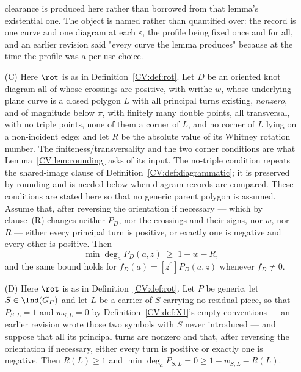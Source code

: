 \begin{theorem}
\begin{enumerate}
clearance is produced here rather than borrowed from that lemma's existential
one. The object is named rather than quantified over: the record is one curve
and one diagram at each $\varepsilon$, the profile being fixed once and for all,
and an earlier revision said "every curve the lemma produces" because at the
time the profile was a per-use choice.
\item[(C)] Here $\rot$ is as in Definition~\ref{CV:def:rot}.
Let $D$ be an oriented knot diagram all of whose crossings are positive, with
writhe $w$, whose underlying plane curve is a closed polygon $L$ with all
principal turns existing, \emph{nonzero}, and of magnitude below $\pi$, with
finitely many double points, all transversal, with no triple points, none of
them a corner of $L$, and no corner of $L$ lying on a non-incident edge; and let
$R$ be the absolute value of its Whitney rotation number.  The
finiteness/transversality and the two corner conditions are what
Lemma~\ref{CV:lem:rounding} asks of its input.  The no-triple condition repeats the
shared-image clause of Definition~\ref{CV:def:diagrammatic}; it is preserved by
rounding and is needed below when diagram records are compared.  These
conditions are stated here so that no generic parent polygon is assumed. Assume that, after reversing the
orientation if necessary --- which by clause~(R) changes neither
$P_D$, nor the crossings and their signs, nor $w$, nor $R$ --- either every
principal turn is positive, or exactly one is negative and every other is
positive. Then
\begin{equation}
\min\deg_a P_D(a,z)\;\geq\;1-w-R,
\label{CV:eq:floor}
\end{equation}
and the same bound holds for $f_D(a)=[z^0]P_D(a,z)$ whenever $f_D\neq0$.
\item[(D)] Here $\rot$ is as in Definition~\ref{CV:def:rot}.
Let $P$ be generic, let $S\in\Ind(G_P)$ and let $L$ be a carrier of $S$ carrying
no residual piece, so that $P_{S,L}=1$ and $w_{S,L}=0$ by
Definition~\ref{CV:def:X1}'s empty conventions --- an earlier revision wrote those
two symbols with $S$ never introduced --- and suppose that all its principal turns are nonzero and that,
after reversing the orientation if necessary, either every turn is positive or
exactly one is negative. Then $R(L)\geq1$ and
$\min\deg_a P_{S,L}=0\geq 1-w_{S,L}-R(L)$.
\end{enumerate}
\end{theorem}
